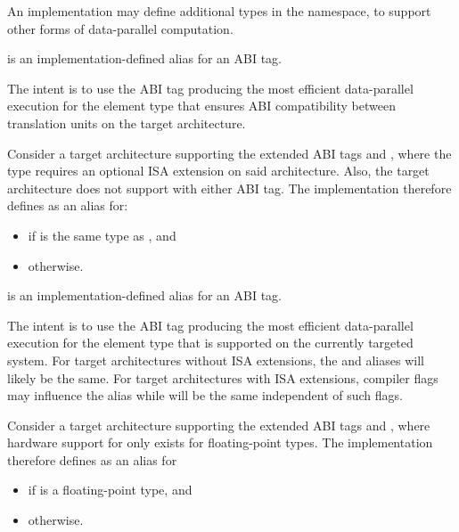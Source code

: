 \begin{wgText}
\pnum
An implementation may define additional  types in the  namespace, to support other forms of data-parallel computation.

\pnum
{} is an implementation-defined alias for an ABI tag. \begin{note}The intent is to use the ABI tag producing the most efficient data-parallel execution for the element type  that ensures ABI compatibility between translation units on the target architecture.\end{note}
\begin{example}
  Consider a target architecture supporting the extended ABI tags  and , where the  type requires an optional ISA extension on said architecture. Also, the target architecture does not support  with either ABI tag. The implementation therefore defines  as an alias for:
  \begin{itemize}
    \item {} if  is the same type as , and
    \item {} otherwise.
  \end{itemize}
\end{example}

\pnum
{} is an implementation-defined alias for an ABI tag. \begin{note}The intent is to use the ABI tag producing the most efficient data-parallel execution for the element type  that is supported on the currently targeted system. For target architectures without ISA extensions, the  and  aliases will likely be the same. For target architectures with ISA extensions, compiler flags may influence the  alias while  will be the same independent of such flags.\end{note}
\begin{example}
  Consider a target architecture supporting the extended ABI tags  and , where hardware support for  only exists for floating-point types. The implementation therefore defines  as an alias for
  \begin{itemize}
    \item {} if  is a floating-point type, and
    \item {} otherwise.
  \end{itemize}
\end{example}


\end{wgText}
